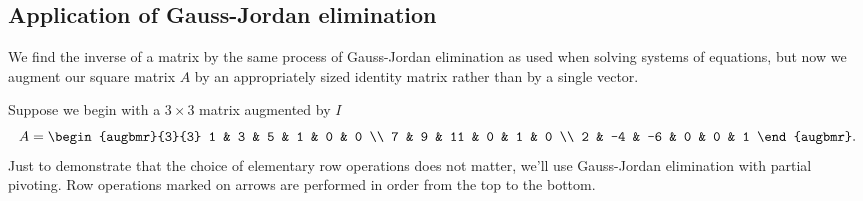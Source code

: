 \documentclass[m3380-lec-main.tex]{subfiles}
\begin{document}
\subsection{Application of Gauss-Jordan elimination}
We find the inverse of a matrix by the same process of Gauss-Jordan elimination as used when solving systems of equations, but now we augment our square matrix $A$ by an appropriately sized identity matrix rather than by a single vector.

\begin{exmp} Suppose we begin with a $3\times 3$ matrix augmented by $I$
\[A = \begin{augbmr}{3}{3}
	1 & 3 & 5 & 1 & 0 & 0 \\
	7 & 9 & 11 & 0 & 1 & 0 \\
	2 & -4 & -6 & 0 & 0 & 1
	\end{augbmr}.\]
Just to demonstrate that the choice of elementary row operations does not matter, we'll use Gauss-Jordan elimination with partial pivoting. Row operations marked on arrows are performed in order from the top to the bottom.


\end{exmp}
\end{document}

